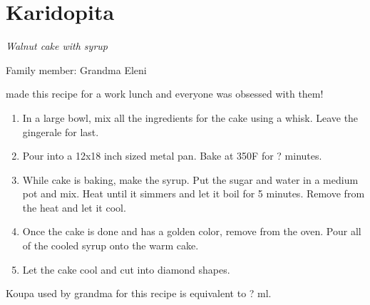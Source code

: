 \chapter{Karidopita}
\label{ch:karidopita}


\textit{Walnut cake with syrup}

Family member: Grandma Eleni

 made this recipe for a work lunch and everyone was obsessed with them!

\begin{enumerate}
    \item In a large bowl, mix all the ingredients for the cake using a whisk. Leave the gingerale for last.
    \item Pour into a 12x18 inch sized metal pan. Bake at 350\degree F for ? minutes.
    \item While cake is baking, make the syrup. Put the sugar and water in a medium pot and mix. Heat until it simmers and let it boil for 5 minutes. Remove from the heat and let it cool.
    \item Once the cake is done and has a golden color, remove from the oven. Pour all of the cooled syrup onto the warm cake.
    \item Let the cake cool and cut into diamond shapes.
\end{enumerate}

Koupa used by grandma for this recipe is equivalent to ? ml.


